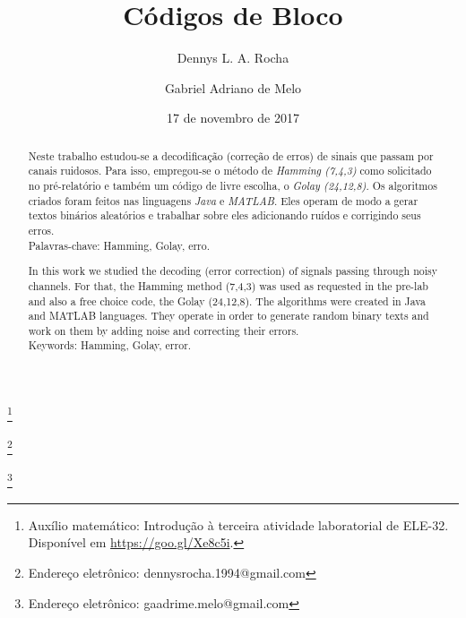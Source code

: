 \documentclass[%
aip,
jmp,%
amsmath,amssymb,
reprint,%
]{revtex4-1}
\begin{document}
	
	
	\title[Códigos de Bloco]{Códigos de Bloco}
	\thanks{Auxílio matemático: Introdução à terceira atividade laboratorial de ELE-32. Dispon\'ivel em \url{https://goo.gl/Xe8c5i}.}%
	\author{Dennys L. A. Rocha}
	\thanks{Endereço eletrônico: dennysrocha.1994@gmail.com}
	
	\author{Gabriel Adriano de Melo}%
	\thanks{Endereço eletrônico: gaadrime.melo@gmail.com}
	
	
	
	
	\date{17 de novembro de 2017}%
	
	\begin{abstract}
		
		Neste trabalho estudou-se a decodificação (correção de erros) de sinais que passam por canais ruidosos. Para isso, empregou-se o método de \textit{Hamming (7,4,3)} como solicitado no pré-relatório e também um código de livre escolha, o \textit{Golay (24,12,8)}. Os algoritmos criados foram feitos nas linguagens \textit{Java} e \textit{MATLAB}. Eles operam de modo a gerar textos binários aleatórios e trabalhar sobre eles adicionando ruídos e corrigindo seus erros.\\[5pt]
		\noindent
		Palavras-chave: Hamming, Golay, erro.\\[5pt]
		\noindent
		
		
		In this work we studied the decoding (error correction) of signals passing through noisy channels. For that, the Hamming method (7,4,3) was used as requested in the pre-lab and also a free choice code, the Golay (24,12,8). The algorithms were created in Java and MATLAB languages. They operate in order to generate random binary texts and work on them by adding noise and correcting their errors.\\[5pt]
		\noindent
		Keywords: Hamming, Golay, error.\\[5pt]
	\end{abstract}
	
\end{document}
